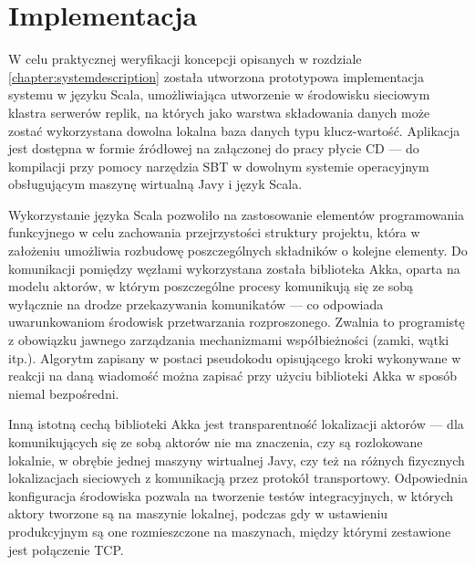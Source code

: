 \chapter{Implementacja} \label{chapter:implementation}

W celu praktycznej weryfikacji koncepcji opisanych w rozdziale \ref{chapter:systemdescription} została utworzona prototypowa implementacja systemu w języku Scala, umożliwiająca utworzenie w środowisku sieciowym klastra serwerów replik, na których jako warstwa składowania danych może zostać wykorzystana dowolna lokalna baza danych typu klucz-wartość. Aplikacja jest dostępna w formie źródłowej na załączonej do pracy płycie CD --- do kompilacji przy pomocy narzędzia SBT w dowolnym systemie operacyjnym obsługującym maszynę wirtualną Javy i język Scala.

Wykorzystanie języka Scala pozwoliło na zastosowanie elementów programowania funkcyjnego w celu zachowania przejrzystości struktury projektu, która w założeniu umożliwia rozbudowę poszczególnych składników o kolejne elementy. Do komunikacji pomiędzy węzłami wykorzystana została biblioteka Akka, oparta na modelu aktorów, w którym poszczególne procesy komunikują się ze sobą wyłącznie na drodze przekazywania komunikatów --- co odpowiada uwarunkowaniom środowisk przetwarzania rozproszonego. Zwalnia to programistę z obowiązku jawnego zarządzania mechanizmami współbieżności (zamki, wątki itp.). Algorytm zapisany w postaci pseudokodu opisującego kroki wykonywane w reakcji na daną wiadomość można zapisać przy użyciu biblioteki Akka w sposób niemal bezpośredni.

Inną istotną cechą biblioteki Akka jest transparentność lokalizacji aktorów --- dla komunikujących się ze sobą aktorów nie ma znaczenia, czy są rozlokowane lokalnie, w obrębie jednej maszyny wirtualnej Javy, czy też na różnych fizycznych lokalizacjach sieciowych z komunikacją przez protokół transportowy. Odpowiednia konfiguracja środowiska pozwala na tworzenie testów integracyjnych, w których aktory tworzone są na maszynie lokalnej, podczas gdy w ustawieniu produkcyjnym są one rozmieszczone na maszynach, między którymi zestawione jest połączenie TCP.



